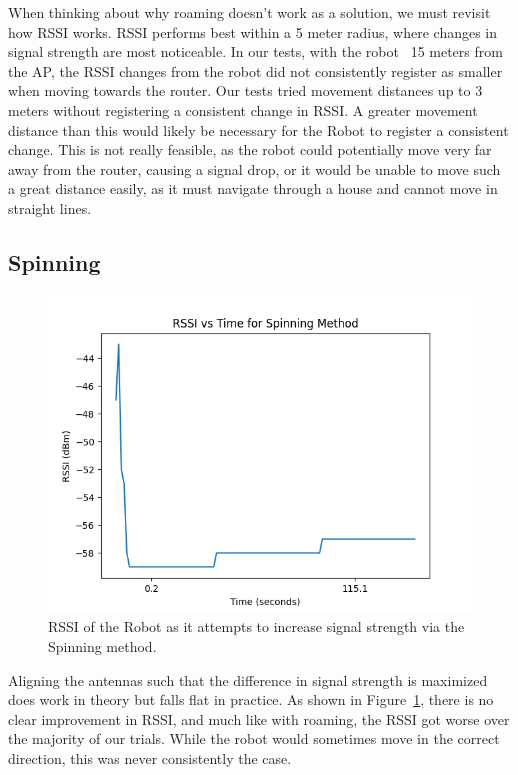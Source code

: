 When thinking about why roaming doesn’t work as a solution, we must revisit how RSSI works. RSSI performs best within a 5 meter radius, where changes in signal strength are most noticeable. In our tests, with the robot ~15 meters from the AP, the RSSI changes from the robot did not consistently register as smaller when moving towards the router. Our tests tried movement distances up to 3 meters without registering a consistent change in RSSI. A greater movement distance than this would likely be necessary for the Robot to register a consistent change. This is not really feasible, as the robot could potentially move very far away from the router, causing a signal drop, or it would be unable to move such a great distance easily, as it must navigate through a house and cannot move in straight lines.

\subsection{Spinning}

\begin{figure}[tp]

\centering

\includegraphics[scale=0.5]{figures/rssi_microwave}

\caption{RSSI of the Robot as it attempts to increase signal strength via the Spinning method.}

\label{fig:rssi_microwave}

\end{figure}

Aligning the antennas such that the difference in signal strength is maximized does work in theory but falls flat in practice. As shown in Figure~\ref{fig:rssi_microwave}, there is no clear improvement in RSSI, and much like with roaming, the RSSI got worse over the majority of our trials. While the robot would sometimes move in the correct direction, this was never consistently the case.

